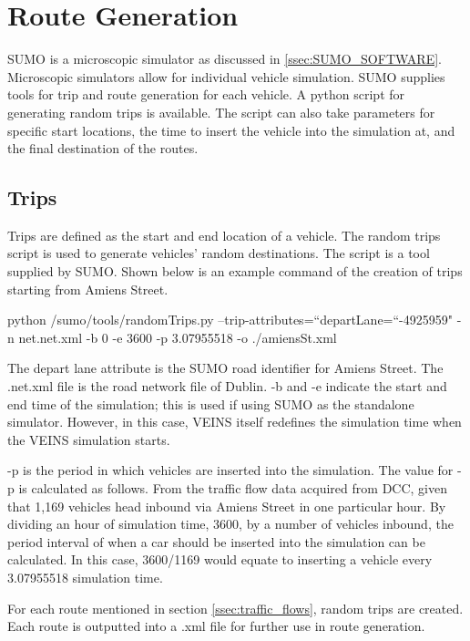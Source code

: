 \pagebreak

\section{Route Generation}
\ac{SUMO} is a microscopic simulator as discussed in \ref{ssec:SUMO_SOFTWARE}. Microscopic simulators allow for individual vehicle simulation. \ac{SUMO} supplies tools for trip and route generation for each vehicle. A python script for generating random trips is available. The script can also take parameters for specific start locations, the time to insert the vehicle into the simulation at, and the final destination of the routes. 

\subsection{Trips}\label{ssec:trips}
Trips are defined as the start and end location of a vehicle. The random trips script is used to generate vehicles' random destinations. The script is a tool supplied by \ac{SUMO}. Shown below is an example command of the creation of trips starting from Amiens Street.

\begin{displayquote}
    python /sumo/tools/randomTrips.py --trip-attributes=``departLane=``-4925959" -n net.net.xml -b 0 -e 3600 -p 3.07955518 -o ./amiensSt.xml
\end{displayquote}

The depart lane attribute is the SUMO road identifier for Amiens Street. The .net.xml file is the road network file of Dublin. -b and -e indicate the start and end time of the simulation; this is used if using \ac{SUMO} as the standalone simulator. However, in this case, VEINS itself redefines the simulation time when the VEINS simulation starts.

-p is the period in which vehicles are inserted into the simulation. The value for -p is calculated as follows. From the traffic flow data acquired from \ac{DCC}, given that 1,169 vehicles head inbound via Amiens Street in one particular hour. By dividing an hour of simulation time, 3600, by a number of vehicles inbound, the period interval of when a car should be inserted into the simulation can be calculated. In this case, 3600/1169 would equate to inserting a vehicle every 3.07955518 simulation time.

For each route mentioned in section \ref{ssec:traffic_flows}, random trips are created. Each route is outputted into a .xml file for further use in route generation.

